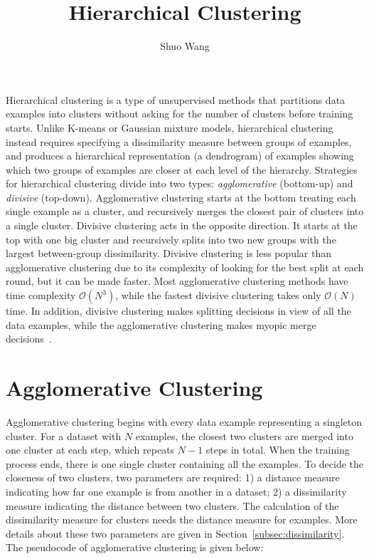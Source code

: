 \title{Hierarchical Clustering}
\label{chp:hierarchical-clustering}
\author{Shuo Wang}
\maketitle

Hierarchical clustering is a type of unsupervised methods that partitions data examples into clusters without asking for the number of clusters before training starts. Unlike K-means or Gaussian mixture models, hierarchical clustering instead requires specifying a dissimilarity measure between groups of examples, and produces a hierarchical representation (a dendrogram) of examples showing which two groups of examples are closer at each level of the hierarchy. Strategies for hierarchical clustering divide into two types: \textit{agglomerative} (bottom-up) and \textit{divisive} (top-down). Agglomerative clustering starts at the bottom treating each single example as a cluster, and recursively merges the closest pair of clusters into a single cluster. Divisive clustering acts in the opposite direction. It starts at the top with one big cluster and recursively splits into two new groups with the largest between-group dissimilarity. Divisive clustering is less popular than agglomerative clustering due to its complexity of looking for the best split at each round, but it can be made faster. Most agglomerative clustering methods have time complexity $\mathcal{O}(N^3)$, while the fastest divisive clustering takes only $\mathcal{O}(N)$ time. In addition, divisive clustering makes splitting decisions in view of all the data examples, while the agglomerative clustering makes myopic merge decisions~\cite{Murphy2012}. 

\section{Agglomerative Clustering}
\label{sec:agglo-cluster}


Agglomerative clustering begins with every data example representing a singleton cluster. For a dataset with $N$ examples, the closest two clusters are merged into one cluster at each step, which repeats $N-1$ steps in total. When the training process ends, there is one single cluster containing all the examples. To decide the closeness of two clusters, two parameters are required: 1) a distance measure indicating how far one example is from another in a dataset; 2) a dissimilarity measure indicating the distance between two clusters. The calculation of the dissimilarity measure for clusters needs the distance measure for examples. More details about these two parameters are given in Section~\ref{subsec:dissimilarity}. The pseudocode of agglomerative clustering is given below:


